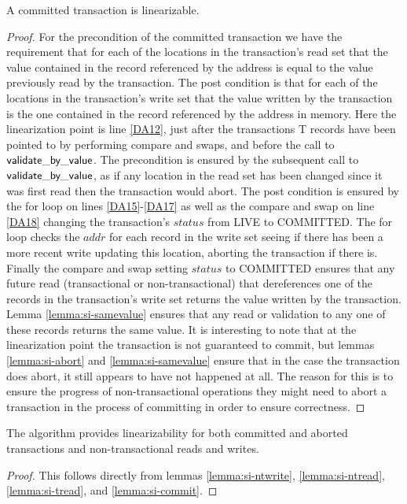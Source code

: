 \begin{lemma}
\label{lemma:si-commit}
A committed transaction is linearizable.
\end{lemma}
\begin{proof}
For the precondition of the committed transaction we have the requirement
that for each of the locations in the transaction's read set that the value
contained in the record referenced by the address is equal to the value 
previously read by the transaction.
The post condition is that for each of the locations in the transaction's write set
that the value written by the transaction is the one contained in the record
referenced by the address in memory.
Here the linearization point is line \ref{DA12}, just after the transactions T records
have been pointed to by performing compare and swaps, and before the call to
$\sf{validate\_by\_value}$.
The precondition is ensured by the subsequent call to $\sf{validate\_by\_value}$,
as if any location in the read set has been changed since it was first read then
the transaction would abort.
The post condition is ensured by the for loop on lines \ref{DA15}-\ref{DA17} as well
as the compare and swap on line \ref{DA18} changing the transaction's $\mathit{status}$
from LIVE to COMMITTED.
The for loop checks the $\mathit{addr}$ for each record in the write set seeing
if there has been a more recent write updating this location, aborting the transaction
if there is.
Finally the compare and swap setting $\mathit{status}$ to COMMITTED ensures
that any future read (transactional or non-transactional) that dereferences one of
the records in the transaction's write set returns the value written by the transaction.
Lemma \ref{lemma:si-samevalue} ensures that any read or validation to any one of these
records returns the same value.
It is interesting to note that at the linearization point the transaction is not
guaranteed to commit, but lemmas \ref{lemma:si-abort} and \ref{lemma:si-samevalue}
ensure that in the case the transaction does abort, it still appears to have not happened
at all.
The reason for this is to ensure the progress of non-transactional operations they might
need to abort a transaction in the process of committing in order to ensure correctness.
\end{proof}



\begin{theorem}
\label{theorem:si-lin}
The algorithm provides linearizability for both committed and aborted transactions
and non-transactional reads and writes.
\end{theorem}
\begin{proof}
This follows directly from lemmas \ref{lemma:si-ntwrite}, \ref{lemma:si-ntread}, \ref{lemma:si-tread},
and \ref{lemma:si-commit}.
\end{proof}



